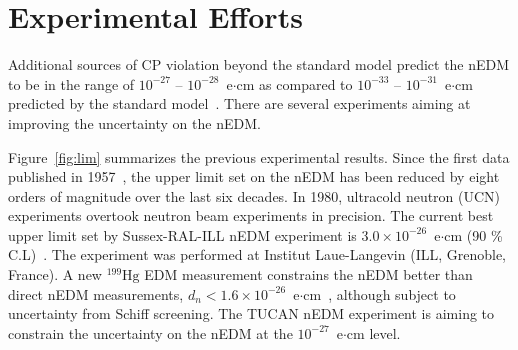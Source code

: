 \section{Experimental Efforts}\label{sec:lim}

Additional sources of CP violation beyond the standard model predict the nEDM to be in the range of $10^{-27}$ -- $10^{-28}$~e$\cdot$cm as compared to $10^{-33}$ -- $10^{-31}$~e$\cdot$cm predicted by the standard model~\cite{theory_lim_1, theory_lim_2, theory_lim_3}. There are several experiments aiming at improving the uncertainty on the nEDM. 


Figure~\ref{fig:lim} summarizes the previous experimental results. Since the first data published in 1957~\cite{1_lim}, the upper limit set on the nEDM has been reduced by eight orders of magnitude over the last six decades. In 1980, ultracold neutron (UCN) experiments overtook neutron beam experiments in precision. The current best upper limit set by Sussex-RAL-ILL nEDM experiment is $3.0 \times 10^{-26}$~e$\cdot$cm (90 \% C.L)~\cite{bestLim_1,bestLim_2}. The experiment was performed at Institut Laue-Langevin (ILL, Grenoble, France). A new $^{199}\mathrm{Hg}$ EDM measurement constrains the nEDM better than direct nEDM measurements, $d_n<\mathrm{1.6\times10^{-26}}$~e$\cdot$cm~\cite{schiff_screen}, although subject to uncertainty from Schiff screening. The TUCAN nEDM experiment is aiming to constrain the uncertainty on the nEDM at the $10^{-27}$~e$\cdot$cm level. 




